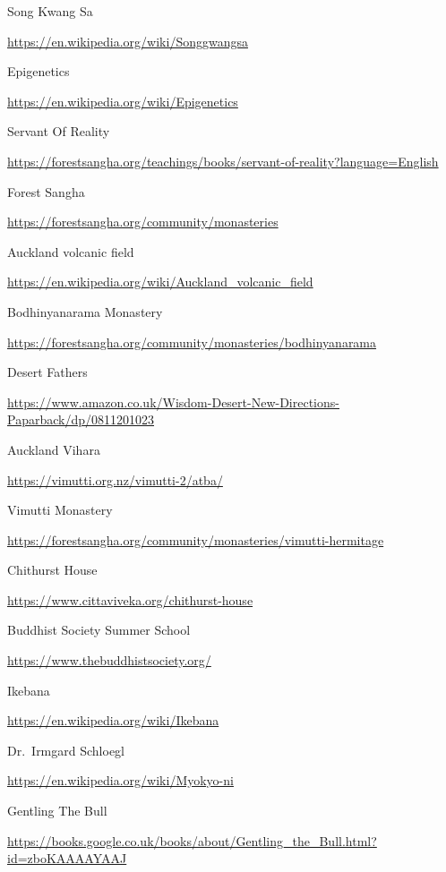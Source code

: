 \begin{thebibliography}{9}
 Song Kwang Sa

  {\urlsize \url{https://en.wikipedia.org/wiki/Songgwangsa}}

 Epigenetics

  {\urlsize \url{https://en.wikipedia.org/wiki/Epigenetics}}

 Servant Of Reality

  {\urlsize \url{https://forestsangha.org/teachings/books/servant-of-reality?language=English}}

 Forest Sangha

  {\urlsize \url{https://forestsangha.org/community/monasteries}}

 Auckland volcanic field

  {\urlsize \url{https://en.wikipedia.org/wiki/Auckland_volcanic_field}}

 Bodhinyanarama Monastery

  {\urlsize \url{https://forestsangha.org/community/monasteries/bodhinyanarama}}

 Desert Fathers

  {\urlsize \url{https://www.amazon.co.uk/Wisdom-Desert-New-Directions-Paparback/dp/0811201023}}

 Auckland Vihara

  {\urlsize \url{https://vimutti.org.nz/vimutti-2/atba/}}

 Vimutti Monastery

  {\urlsize \url{https://forestsangha.org/community/monasteries/vimutti-hermitage}}

 Chithurst House

  {\urlsize \url{https://www.cittaviveka.org/chithurst-house}}

 Buddhist Society Summer School

  {\urlsize \url{https://www.thebuddhistsociety.org/}}

 Ikebana

  {\urlsize \url{https://en.wikipedia.org/wiki/Ikebana}}

 Dr.~Irmgard Schloegl

  {\urlsize \url{https://en.wikipedia.org/wiki/Myokyo-ni}}

 Gentling The Bull

  {\urlsize \url{https://books.google.co.uk/books/about/Gentling_the_Bull.html?id=zboKAAAAYAAJ}}


\end{thebibliography}
